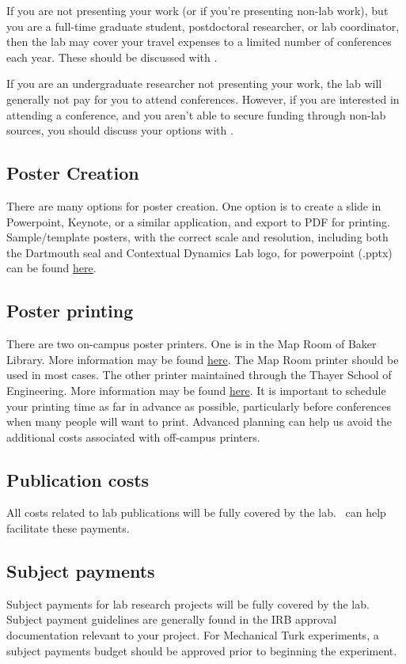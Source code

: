 \documentclass{tufte-book} %
\begin{document}
 If you are not presenting your work (or if you're presenting non-lab
 work), but you are a full-time graduate student, postdoctoral
 researcher, or lab coordinator, then the lab may cover your travel
 expenses to a limited number of conferences each year.  These should
 be discussed with \director.

If you are an undergraduate researcher not presenting your work, the lab
will generally not pay for you to attend conferences.  However, if you
are interested in attending a conference, and you aren't able to
secure funding through non-lab sources, you should discuss your
options with \director.

 \subsection{Poster Creation}
 There are many options for poster creation. One option is to create a 
 slide in Powerpoint, Keynote, or a similar application, and export to PDF 
 for printing. Sample/template posters, with the correct scale and resolution, 
 including both the Dartmouth seal and Contextual Dynamics Lab logo, 
 for powerpoint (.pptx) can be found \href{http}{here}. 

 \subsection{Poster printing}
 There are two on-campus poster printers.  One is in the Map Room of
 Baker Library.  More information may be found
 \href{http://www.dartmouth.edu/~library/maproom/printingfaq.html}{here}.
 The Map Room printer should be used in most cases.  The other printer
 maintained through the Thayer School of Engineering.  More
 information may be found
 \href{http://kb.thayer.dartmouth.edu/article/286-printing}{here}.  It
 is important to schedule your printing time as far in advance as
 possible, particularly before conferences when many people will want
 to print.  Advanced planning can help us avoid the additional costs
 associated with off-campus printers.


 \subsection{Publication costs}
All costs related to lab publications will be fully covered by the
lab.  \coordinator~can help facilitate these payments.

 \subsection{Subject payments}
 Subject payments for lab research projects will be fully covered by
 the lab.  Subject payment guidelines are generally found in the IRB
 approval documentation relevant to your project.  For Mechanical Turk
 experiments, a subject payments budget should be approved prior to
 beginning the experiment.
\end{document}
